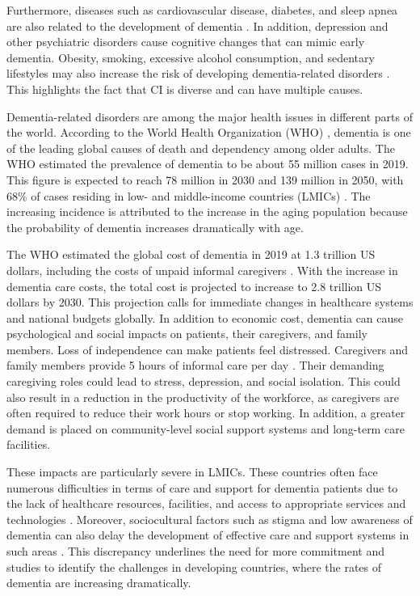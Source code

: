 Furthermore, diseases such as cardiovascular disease, diabetes, and sleep apnea are also related to the development of dementia \cite{Alzheimer2024}. In addition, depression and other psychiatric disorders cause cognitive changes that can mimic early dementia. Obesity, smoking, excessive alcohol consumption, and sedentary lifestyles may also increase the risk of developing dementia-related disorders \cite{WHO2025Dementia}. This highlights the fact that CI is diverse and can have multiple causes.

Dementia-related disorders are among the major health issues in different parts of the world. According to the World Health Organization (\acrshort{WHO}) \cite{WHO2025Dementia}, dementia is one of the leading global causes of death and dependency among older adults. The WHO estimated the prevalence of dementia to be about 55 million cases in 2019. This figure is expected to reach 78 million in 2030 and 139 million in 2050, with 68\% of cases residing in low- and middle-income countries (\acrshort{LMICs}) \cite{Alzheimer2025}. The increasing incidence is attributed to the increase in the aging population because the probability of dementia increases dramatically with age. 

The WHO estimated the global cost of dementia in 2019 at 1.3 trillion US dollars, including the costs of unpaid informal caregivers \cite{WHO2025Dementia}. With the increase in dementia care costs, the total cost is projected to increase to 2.8 trillion US dollars by 2030. This projection calls for immediate changes in healthcare systems and national budgets globally. In addition to economic cost, dementia can cause psychological and social impacts on patients, their caregivers, and family members. Loss of independence can make patients feel distressed. Caregivers and family members provide 5 hours of informal care per day \cite{WHO2025Dementia}. Their demanding caregiving roles could lead to stress, depression, and social isolation. This could also result in a reduction in the productivity of the workforce, as caregivers are often required to reduce their work hours or stop working. In addition, a greater demand is placed on community-level social support systems and long-term care facilities. 

These impacts are particularly severe in LMICs. These countries often face numerous difficulties in terms of care and support for dementia patients due to the lack of healthcare resources, facilities, and access to appropriate services and technologies \cite{Mattap2022Economic}. Moreover, sociocultural factors such as stigma and low awareness of dementia can also delay the development of effective care and support systems in such areas \cite{WHO2025Dementia}. This discrepancy underlines the need for more commitment and studies to identify the challenges in developing countries, where the rates of dementia are increasing dramatically. 

